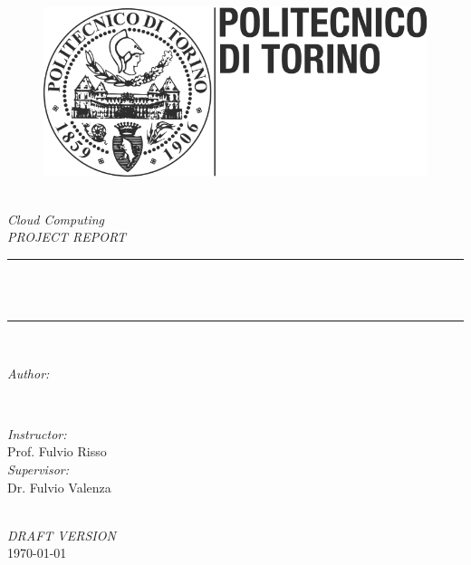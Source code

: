 \begin{titlepage}
\newcommand{\HRule}{\rule{\linewidth}{0.5mm}}
\begin{figure}[!htb]
     \centering
     \includegraphics[width=.3\linewidth]{title/polito_logo.png}
\end{figure}

\center 
\quad\\[1.5cm]

\textsl{\Large Cloud Computing}\\[1.5cm] 
\textsl{\large PROJECT REPORT}\\[1.5cm] 
\makeatletter
\HRule \\[0.5cm]
{ \huge \bfseries \@title}\\[0.5cm] 
\HRule \\[1.5cm]
\begin{minipage}{0.4\textwidth}
\begin{flushleft} \large
\emph{Author:}\\
\@author 
\end{flushleft}
\end{minipage}
~
\begin{minipage}{0.4\textwidth}
\begin{flushright} \large
\emph{Instructor:} \\
\textup{Prof. Fulvio Risso} \\
\vspace{1cm}
\emph{Supervisor:} \\
\textup{Dr. Fulvio Valenza}
\end{flushright}
\end{minipage}\\[3cm]
\makeatother
\vspace{1cm}
\textsl{\large \color{blue} DRAFT VERSION \color{black}}\\[1.5cm] 
{\large \today}\\[2cm] 
\vfill 
\end{titlepage}